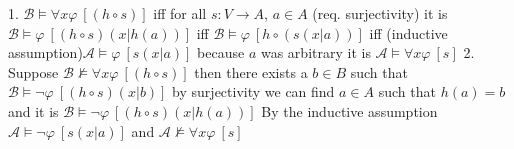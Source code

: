 {\begin{enumerate}
        1. $\mathcal{B}\models \forall x \varphi  \: [(h\circ s)]$
        iff for all $s:V\to A$, $a\in A$ (req. surjectivity) it is $\mathcal{B}\models \varphi  \: [(h\circ s)(x | h(a))]$
        iff $\mathcal{B}\models \varphi  \: [h\circ (s(x |a))]$
        iff (inductive assumption)$\mathcal{A}\models \varphi  \: [s(x|a)]$ because $a$ was arbitrary it is $\mathcal{A}\models \forall x \varphi \: [s]$
        2. Suppose $\mathcal{B}\not\models \forall x \varphi  \: [(h\circ s)]$ then there exists a $b\in B$ such that $\mathcal{B}\models \lnot \varphi  \: [(h\circ s)(x | b)]$
        by surjectivity we can find $a\in A$ such that $h(a)=b$ and it is $\mathcal{B}\models \lnot \varphi  \: [(h\circ s)(x | h(a))]$
        By the inductive assumption $\mathcal{A}\models \lnot \varphi  \: [s(x|a)]$ and $\mathcal{A}\not\models \forall x \varphi \: [s]$
    \end{enumerate}
}

